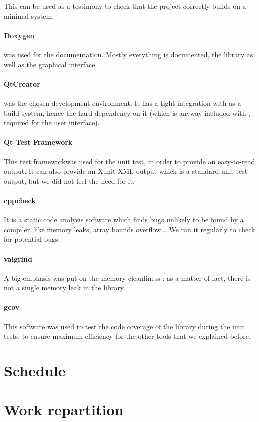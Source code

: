 This can be used as a testimony to check that the project correctly builds on a minimal system.

\paragraph{Doxygen} was used for the documentation. Mostly everything is documented, the library as well as the graphical interface.

\paragraph{QtCreator} was the chosen development environment. It has a tight integration with  as a build system, hence the hard dependency on it (which is anyway included with , required for the user interface). 

\paragraph{Qt Test Framework}
This test frameworkwas used for the unit test, in order to provide an easy-to-read output. It can also provide an Xunit XML output which is a standard unit test output, but we did not feel the need for it. 

\paragraph{cppcheck}
It is a static code analysis software which finds bugs unlikely to be found by a compiler, like memory leaks, array bounds overflow... We ran it regularly to check for potential bugs.

\paragraph{valgrind}
A big emphasis was put on the memory cleanliness : as a matter of fact, there is not a single memory leak in the library.

\paragraph{gcov}
This software was used to test the code coverage of the library during the unit tests, to ensure maximum efficiency for the other tools that we explained before.

\section{Schedule}
\section{Work repartition}